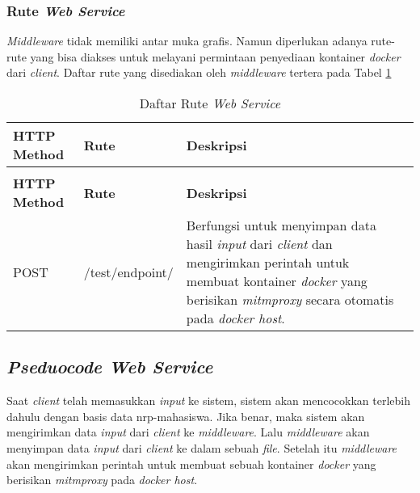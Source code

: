   \subsubsection{Rute \textit{Web Service}}
  \textit{Middleware} tidak memiliki antar muka grafis. Namun diperlukan adanya rute-rute yang bisa diakses untuk melayani permintaan penyediaan kontainer \textit{docker} dari \textit{client}. Daftar rute yang disediakan oleh \textit{middleware} tertera pada Tabel \ref{tabelRuteWebService}
  \begin{longtable}{|p{}|p{}|p{}|p{}|} %
  	
  	\caption{Daftar Rute \textit{Web Service}} \label{tabelRuteWebService} \\
  	\hline
  	\textbf{HTTP Method} & \textbf{Rute} & \textbf{Deskripsi} \\ \hline
  	
  	\endfirsthead
  	\caption[]{Daftar Rute \textit{Web Service}}  \\
  	\hline
  	\textbf{HTTP Method} & \textbf{Rute} & \textbf{Deskripsi}  \\ \hline
  	
  	\endhead
  	\endfoot
  	\endlastfoot
  	
  	POST & /test/endpoint/ & Berfungsi untuk menyimpan data hasil \textit{input} dari \textit{client} dan mengirimkan perintah untuk membuat kontainer \textit{docker} yang berisikan \textit{mitmproxy} secara otomatis pada \textit{docker host}.\\ \hline
  \end{longtable}
  
  \subsection{\textit{Pseduocode Web Service}}
  Saat \textit{client} telah memasukkan \textit{input} ke sistem, sistem akan mencocokkan terlebih dahulu dengan basis data nrp-mahasiswa. Jika benar, maka sistem akan mengirimkan data \textit{input} dari \textit{client} ke \textit{middleware}. Lalu \textit{middleware} akan menyimpan data \textit{input} dari \textit{client} ke dalam sebuah \textit{file}. Setelah itu \textit{middleware} akan mengirimkan perintah untuk membuat sebuah kontainer \textit{docker} yang berisikan \textit{mitmproxy} pada \textit{docker host}.
  
